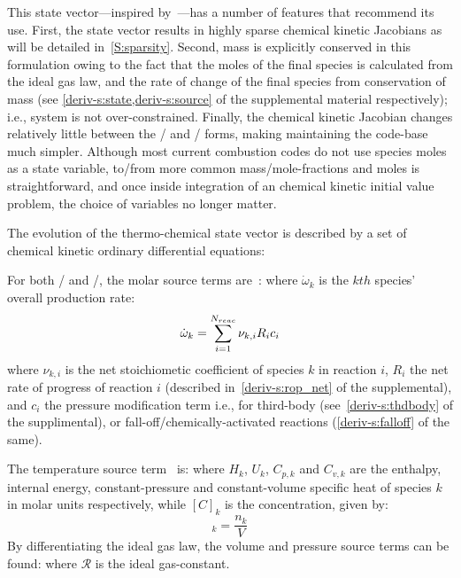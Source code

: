 \documentclass[12pt,number,sort&compress,preprint]{elsarticle}
\begin{document}
This state vector---inspired by~\cite{SCHWER2002270}---has a number of features that recommend its use.
First, the state vector results in highly sparse chemical kinetic Jacobians as will be detailed in~\cref{S:sparsity}.
Second, mass is explicitly conserved in this formulation owing to the fact that the moles of the final species is calculated from the ideal gas law, and the rate of change of the final species from conservation of mass (see \cref{deriv-s:state,deriv-s:source} of the supplemental material respectively); i.e., system is not over-constrained.
Finally, the chemical kinetic Jacobian changes relatively little between the \conp/ and \conv/ forms, making maintaining the code-base much simpler.
Although most current combustion codes do not use species moles as a state variable, to\slash from more common mass\slash mole-fractions and moles is straightforward, and once inside integration of an chemical kinetic initial value problem, the choice of variables no longer matter.

The evolution of the thermo-chemical state vector is described by a set of chemical kinetic ordinary differential equations:

For both \conp/ and \conv/, the molar source terms are~\cite{TurnsStephenR2012Aitc}:
where $\dot{\omega}_k$ is the $kth$ species' overall production rate:
\begin{equation}
 \dot{\omega}_{k} = \sum_{i=1}^{\nr/} \nu_{k, i} R_{i} c_{i}
\end{equation}
where $\nu_{k, i}$ is the net stoichiometic coefficient of species $k$ in reaction $i$, $R_{i}$ the net rate of progress of reaction $i$ (described in~\cref{deriv-s:rop_net} of the supplemental), and $c_{i}$ the pressure modification term i.e., for third-body (see~\cref{deriv-s:thdbody} of the supplimental), or fall-off\slash chemically-activated reactions (\cref{deriv-s:falloff} of the same).

The temperature source term~\cite{TurnsStephenR2012Aitc} is:
where $H_k$, $U_k$, $C_{p,k}$ and $C_{v, k}$ are the enthalpy, internal energy, constant-pressure and constant-volume specific heat of species $k$ in molar units respectively, while $[C]_{k}$ is the concentration, given by:
\begin{equation}
 [C]_{k} = \frac{n_{k}}{V}
\end{equation}
By differentiating the ideal gas law, the volume and pressure source terms can be found:
where $\mathcal{R}$ is the ideal gas-constant.
\end{document}
